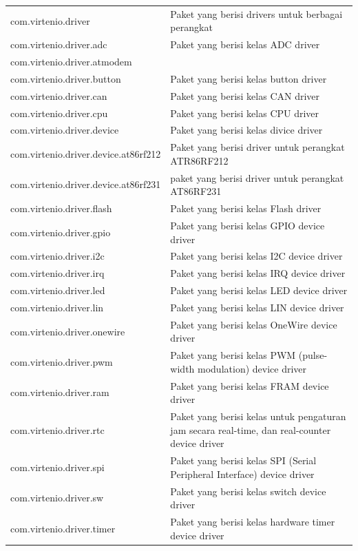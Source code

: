 \documentclass[a4paper,twoside]{article}
\begin{document}
\begin{enumerate}
\begin{table}[H]
\begin{tabular}{|p{6cm}|p{10cm}|}
		\midrule
		com.virtenio.driver & Paket yang berisi drivers untuk berbagai perangkat \\
		com.virtenio.driver.adc  & Paket yang berisi kelas ADC driver \\
		com.virtenio.driver.atmodem & \\
		com.virtenio.driver.button & Paket yang berisi kelas button driver \\
		com.virtenio.driver.can & Paket yang berisi kelas CAN driver \\
		com.virtenio.driver.cpu & Paket yang berisi kelas CPU driver \\
		com.virtenio.driver.device & Paket yang berisi kelas divice driver \\
		com.virtenio.driver.device.at86rf212 & Paket yang berisi driver untuk perangkat ATR86RF212 \\
		com.virtenio.driver.device.at86rf231 & paket yang berisi driver untuk perangkat AT86RF231 \\
		com.virtenio.driver.flash & Paket yang berisi kelas Flash driver  \\
		com.virtenio.driver.gpio & Paket yang berisi kelas GPIO device driver \\
		com.virtenio.driver.i2c & Paket yang berisi kelas I2C device driver \\
		com.virtenio.driver.irq & Paket yang berisi kelas IRQ device driver \\
		com.virtenio.driver.led & Paket yang berisi kelas LED device driver \\
		com.virtenio.driver.lin & Paket yang berisi kelas LIN device driver\\
		com.virtenio.driver.onewire & Paket yang berisi kelas OneWire device driver\\
		com.virtenio.driver.pwm & Paket yang berisi kelas PWM (pulse-width modulation) device driver\\
		com.virtenio.driver.ram & Paket yang berisi kelas FRAM device driver \\
		com.virtenio.driver.rtc & Paket yang berisi kelas untuk pengaturan jam secara real-time, dan real-counter device driver \\
		com.virtenio.driver.spi & Paket yang berisi kelas SPI (Serial Peripheral Interface) device driver \\
		com.virtenio.driver.sw & Paket yang berisi kelas switch device driver \\
		com.virtenio.driver.timer & Paket yang berisi kelas hardware timer device driver\\

\end{tabular}
\end{table}
\end{enumerate}
\end{document}
